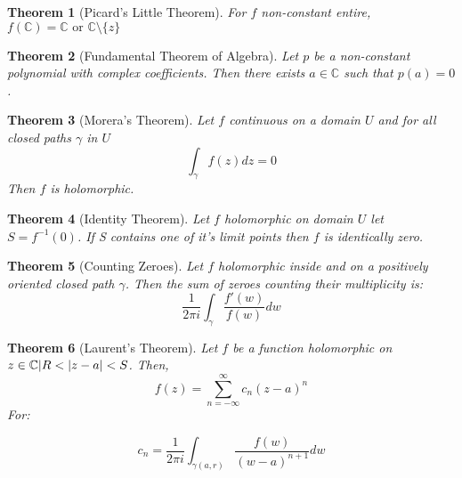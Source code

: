 \documentclass[11pt,a4paper, titlepage]{article}
\newtheorem{theorem}{Theorem}[section]
\DeclarePairedDelimiter\abs{\lvert}{\rvert}
\theoremstyle{definition}
\begin{document}
\begin{theorem}[Picard's Little Theorem]
For $f$ non-constant entire, $f(\mathbb{C}) = \mathbb{C} \textrm{ or } \mathbb{C} \setminus \{z\} $
\end{theorem}

\begin{theorem}[Fundamental Theorem of Algebra]

Let $p$ be a non-constant polynomial with complex coefficients. Then there exists $a \in \mathbb{C}$ such that $p(a) = 0$.

\end{theorem}

\begin{theorem}[Morera's Theorem]
Let $f$ continuous on a domain $U$ and for all closed paths $\gamma$ in $U$
\[
	\int_\gamma f(z) dz = 0
\]
Then $f$ is holomorphic.
\end{theorem}


\begin{theorem}[Identity Theorem]
Let $f$ holomorphic on domain $U$ let $S = f^{-1}({0})$. If S contains one of it's limit points then $f$ is identically zero.
\end{theorem}

\begin{theorem}[Counting Zeroes]
Let $f$ holomorphic inside and on a positively oriented closed path $\gamma$. Then the sum of zeroes counting their multiplicity is:
\[
	\frac{1}{2 \pi i} \int_\gamma \frac{f'(w)}{f(w)}dw 
\]
\end{theorem}

\begin{theorem}[Laurent's Theorem]

Let $f$ be a function holomorphic on ${ z \in  \mathbb{C} | R < \abs{z - a} < S}$. Then, 
\[
 	f(z) = \sum_{n = -\infty}^{\infty} c_n (z-a)^n
 \] 
For:

\[
	c_n = \frac{1}{2 \pi i} \int_{\gamma(a,r)} \frac{f(w)}{(w-a)^{n+1}}dw
\]
\end{theorem}
\end{document}
